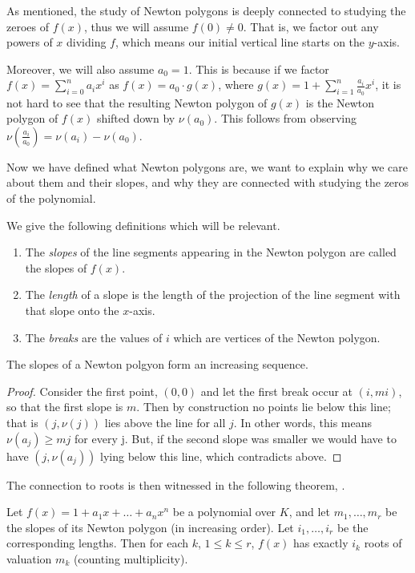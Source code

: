 As mentioned, the study of Newton polygons is deeply connected to studying the zeroes of $f(x)$,
thus we will assume $f(0) \neq 0$. That is, we factor out any powers of $x$ dividing $f$, which
means our initial vertical line starts on the $y$-axis.

Moreover, we will also assume $a_0 = 1$. This is because if we factor
$f(x) = \sum_{i = 0}^n a_i x^i$ as $f(x) = a_0 \cdot g(x)$, where
$ g(x) = 1 + \sum_{i=1}^n \frac{a_i}{a_0}x^i$, it is not hard to see that the resulting Newton
polygon of $g(x)$ is the Newton polygon of $f(x)$ shifted down by $\nu (a_0)$.
This follows from observing $\nu (\frac{a_i}{a_0}) = \nu(a_i) - \nu (a_0)$.

Now we have defined what Newton polygons are, we want to explain why we care about them and their
slopes, and why they are connected with studying the zeros of the polynomial.

We give the following definitions which will be relevant.
\begin{definition}
    \begin{enumerate}
        \item The \emph{slopes} of the line segments appearing in the Newton polygon are called the
        slopes of $f(x)$.
        \item The \emph{length} of a slope is the length of the projection of the line segment with
        that slope onto the $x$-axis.
        \item The \emph{breaks} are the values of $i$ which are vertices of the Newton polygon.
    \end{enumerate}
\end{definition}

\begin{theorem}
  The slopes of a Newton polgyon form an increasing sequence.
\end{theorem}

\begin{proof}
    Consider the first point, $(0,0)$ and let the first break occur at $(i,m i)$, so
    that the first slope is $m$. Then by construction no points lie below this line; that is
    $(j, \nu(j))$ lies above the line for all $j$. In other words, this means $\nu (a_j) \geq m j$
    for every j. But, if the second slope was smaller we would have to have $(j, \nu(a_j))$ lying
    below this line, which contradicts above.
\end{proof}

The connection to roots is then witnessed in the following theorem, \cite[Theorem~7.4.7]{Gouvea}.
\begin{theorem}
    \label{NPPoly}
    Let $f(x) = 1 + a_1 x + \dots + a_nx^n$ be a polynomial over $K$, and let $m_1, \dots, m_r$ be
    the slopes of its Newton polygon (in increasing order). Let $i_1, \dots, i_r$ be the
    corresponding lengths. Then for each $k$, $1 \leq k \leq r$, $f(x)$ has exactly $i_k$ roots of
    valuation $m_k$ (counting multiplicity).
\end{theorem}

